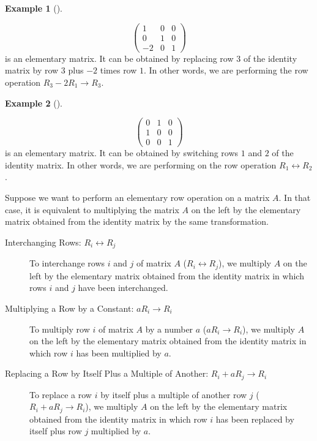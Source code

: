\documentclass[
  a4paper,
  DIV=11,
  numbers=noendperiod,
  oneside]{scrreprt}
\theoremstyle{definition}
\newtheorem{example}{Example}[chapter]
\theoremstyle{remark}
\begin{document}
\begin{example}[]\protect\hypertarget{exm-}{}\label{exm-}

\[\left(\begin{array}{ccc}1 & 0 & 0 \\ 0 & 1 & 0 \\ -2 & 0 & 1\end{array}\right)\]
is an elementary matrix. It can be obtained by replacing row \(3\) of
the identity matrix by row \(3\) plus \(-2\) times row \(1\). In other
words, we are performing the row operation
\(R_{3}-2 R_{1}\rightarrow R_{3}\).

\end{example}

\begin{example}[]\protect\hypertarget{exm-}{}\label{exm-}

\[\left(\begin{array}{ccc}0 & 1 & 0 \\ 1 & 0 & 0 \\ 0 & 0 & 1\end{array}\right)\]
is an elementary matrix. It can be obtained by switching rows \(1\) and
\(2\) of the identity matrix. In other words, we are performing on the
row operation \(R_{1}\leftrightarrow R_{2}\).

\end{example}

Suppose we want to perform an elementary row operation on a matrix
\(A\). In that case, it is equivalent to multiplying the matrix \(A\) on
the left by the elementary matrix obtained from the identity matrix by
the same transformation.

\begin{description}
\item[Interchanging Rows: \(R_{i}\leftrightarrow R_{j}\)]
To interchange rows \(i\) and \(j\) of matrix \(A\)
(\(R_{i}\leftrightarrow R_{j}\)), we multiply \(A\) on the left by the
elementary matrix obtained from the identity matrix in which rows \(i\)
and \(j\) have been interchanged.
\item[Multiplying a Row by a Constant: \(aR_{i}\rightarrow R_{i}\)]
To multiply row \(i\) of matrix \(A\) by a number \(a\)
(\(aR_{i}\rightarrow R_{i}\)), we multiply \(A\) on the left by the
elementary matrix obtained from the identity matrix in which row \(i\)
has been multiplied by \(a\).
\item[Replacing a Row by Itself Plus a Multiple of Another:
\(R_{i}+aR_{j}\rightarrow R_{i}\)]
To replace a row \(i\) by itself plus a multiple of another row \(j\)
(\(R_{i}+aR_{j}\rightarrow R_{i}\)), we multiply \(A\) on the left by
the elementary matrix obtained from the identity matrix in which row
\(i\) has been replaced by itself plus row \(j\) multiplied by \(a\).
\end{description}
\end{document}
